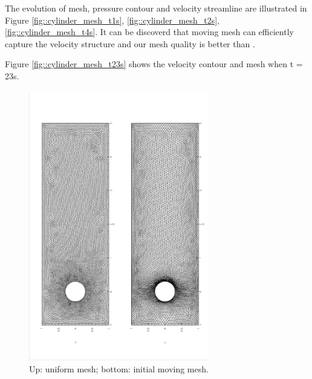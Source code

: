 \documentclass[a4paper, 11pt]{article}
\begin{document}
      The evolution of mesh, pressure contour and velocity streamline 
      are illustrated in Figure \ref{fig::cylinder_mesh_t1s},
      \ref{fig::cylinder_mesh_t2s},
      \ref{fig::cylinder_mesh_t4s}. It can be discoverd that moving
      mesh can efficiently capture the velocity structure and our mesh
      quality is better than \cite{cao1999anr}.
      
      Figure \ref{fig::cylinder_mesh_t23s} shows the velocity contour
      and mesh when t = 23s. 

      \begin{figure}[!htbp]
        \centering
        \includegraphics[width = 0.7\textwidth, angle = -90]{picture/obstacle_flow_data/initial_mesh.eps}
        \caption{\small Up: uniform mesh; bottom: initial
          moving mesh.}
        \label{fig::cylinder_initial_mesh}
      \end{figure}
\end{document}
